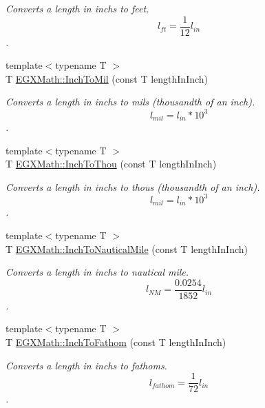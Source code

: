 \begin{DoxyCompactItemize}
\begin{DoxyCompactList}\small\item\em Converts a length in inchs to feet. \[ l_{ft}= \frac{1}{12} l_{in} \]. \end{DoxyCompactList}\item 
{\footnotesize template$<$typename T $>$ }\\T \mbox{\hyperlink{group___e_g_x_math-_conversions-_length_conversions-_imperial-_inch-_imperial_ga87110f96478b747855d7c022ad06818b}{E\+G\+X\+Math\+::\+Inch\+To\+Mil}} (const T length\+In\+Inch)
\begin{DoxyCompactList}\small\item\em Converts a length in inchs to mils (thousandth of an inch). \[ l_{mil}=l_{in} * 10^{3} \]. \end{DoxyCompactList}\item 
{\footnotesize template$<$typename T $>$ }\\T \mbox{\hyperlink{group___e_g_x_math-_conversions-_length_conversions-_imperial-_inch-_imperial_ga2f69d70d71ea01a37e6b8c97c0a95204}{E\+G\+X\+Math\+::\+Inch\+To\+Thou}} (const T length\+In\+Inch)
\begin{DoxyCompactList}\small\item\em Converts a length in inchs to thous (thousandth of an inch). \[ l_{mil}= l_{in} * 10^{3} \]. \end{DoxyCompactList}\item 
{\footnotesize template$<$typename T $>$ }\\T \mbox{\hyperlink{group___e_g_x_math-_conversions-_length_conversions-_imperial-_inch-_nautical_ga40c14b43d58b6c2e3cebb1ff491bdcef}{E\+G\+X\+Math\+::\+Inch\+To\+Nautical\+Mile}} (const T length\+In\+Inch)
\begin{DoxyCompactList}\small\item\em Converts a length in inchs to nautical mile. \[ l_{NM}= \frac{0.0254}{1852} l_{in} \]. \end{DoxyCompactList}\item 
{\footnotesize template$<$typename T $>$ }\\T \mbox{\hyperlink{group___e_g_x_math-_conversions-_length_conversions-_imperial-_inch-_nautical_ga27466d2f562e05c664fb189f8e96e18c}{E\+G\+X\+Math\+::\+Inch\+To\+Fathom}} (const T length\+In\+Inch)
\begin{DoxyCompactList}\small\item\em Converts a length in inchs to fathoms. \[ l_{fathom}= \frac{1}{72} l_{in} \]. \end{DoxyCompactList}\item 

\end{DoxyCompactItemize}
